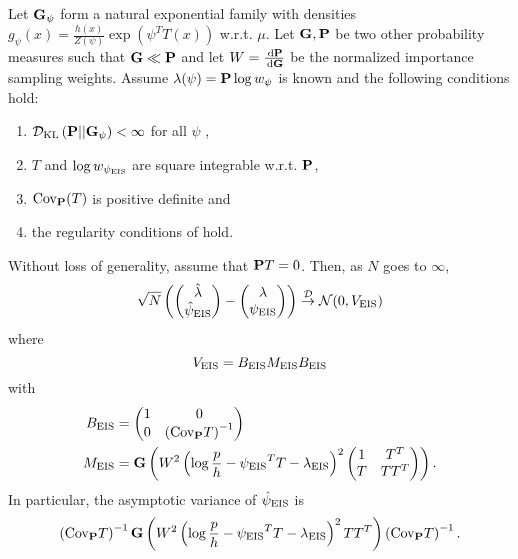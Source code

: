 \begin{theorem}
    \label{thm:clt-eis}
    Let $\G_{\psi}$ form a natural exponential family with densities $g_{\psi}(x) = \frac{h(x)}{Z(\psi)} \exp \left( \psi^{T}T(x) \right)$ w.r.t. $\mu$. Let $\G, \P$ be two other probability measures such that $\G \ll \P$ and let $W = \frac{\d\P}{\d\G}$ be the normalized importance sampling weights. 
    Assume $\lambda(\psi) = \P \log w_{\psi}$ is known and the following conditions hold:
    \begin{enumerate}[label={\bfseries(B\arabic*)}]
        \item\label{it:eis-dkl-dkl-to-base-finite} $\Dkl{\P}{\G_{\psi}} < \infty$ for all $\psi$ ,
        \item\label{it:eis-T-l2} $T$ and $\log w_{\peis}$ are square integrable w.r.t. $\P$,
        \item\label{it:eis-cov-t-spd} $\cov_{\P} (T)$ is positive definite and
        \item\label{it:eis-dkl-regularity} the regularity conditions of  hold.
    \end{enumerate}

    Without loss of generality, assume that $\P T = 0$. Then, as $N$ goes to $\infty$,
    $$
    \sqrt{N} \left( \begin{pmatrix}\hat\lambda \\ \hpeis\end{pmatrix} - \begin{pmatrix}\lambda \\ \peis\end{pmatrix} \right) \Dto \mathcal N(0, V_{\eis})
    $$
    where 
    $$
    V_{\eis} = B_{\eis}M_{\eis}B_{\eis}
    $$
    with
    \begin{align*}
        B_{\eis} &= \begin{pmatrix}
            1 & 0 \\
            0 & \left(\cov_{\P} T\right)^{-1}
        \end{pmatrix}\\
        M_{\eis} &= \G \left(W^{2} \left( \log \frac{p}{h} - \peis^{T}T - \lambda_{\eis}\right)^{2} \begin{pmatrix}
            1& T^{T}\\
             T &  TT^{T}
        \end{pmatrix}
        \right).
    \end{align*}
    In particular, the asymptotic variance of $\hpeis$ is
    $$
    \left( \cov_{\P} T \right)^{-1} \G\left( W^{2} \left( \log \frac{p}{h} - \peis^{T}T - \lambda_{\eis} \right)^{2} T T ^{T} \right)\left( \cov_{\P} T \right)^{-1}.
    $$
\end{theorem}

